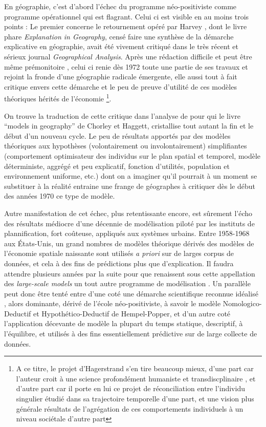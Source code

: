 {En géographie, c'est d'abord l'échec du programme néo-positiviste comme programme opérationnel qui est flagrant. Celui ci est visible en au moins trois points : Le premier concerne le retournement opéré par Harvey \autocite{Harvey1969}, dont le livre phare \textit{Explanation in Geography}, censé faire une synthèse de la démarche explicative en géographie, avait été vivement critiqué \autocite{Gale1972} dans le très récent et sérieux journal \textit{Geographical Analysis}. Après une rédaction difficile et peut être même prémonitoire \autocite[47]{Barnes2006}, celui ci renie dès 1972 \autocite{Harvey1972} toute une partie de ses travaux et rejoint la fronde d'une géographie radicale émergente, elle aussi tout à fait critique envers cette démarche et le peu de preuve d'utilité de ces modèles théoriques hérités de l'économie \footnote{A ce titre, le projet d'Hagerstrand s'en tire beaucoup mieux, d'une part car l'auteur croit à une science profondément humaniste et transdiscplinaire \autocite{Bailly2000}, et d'autre part car il porte en lui ce projet de réconciliation entre l'individu singulier étudié dans sa trajectoire temporelle d'une part, et une vision plus générale résultats de l’agrégation de ces comportements individuels à un niveau sociétale d'autre part}.

On trouve la traduction de cette critique dans l'analyse de \textcite{Golledge2006} pour qui le livre \foreignquote{english}{models in geography} de Chorley et Haggett,  cristallise tout autant la fin et le début d'un nouveau cycle. Le peu de résultats apportés par des modèles théoriques aux hypothèses (volontairement ou involontairement) simplifiantes (comportement optimisateur des individus sur le plan spatial et temporel, modèle déterministe, aggrégé et peu explicatif, fonction d'utilités, population et environnement uniforme, etc.) dont on a imaginer qu'il pourrait à un moment se substituer à la réalité entraine une frange de géographes à critiquer dès le début des années 1970 ce type de modèle. 

Autre manifestation de cet échec, plus retentissante encore, est sûrement l'écho \autocite{Lee1973} des résultats médiocre d'une décennie de modélisation piloté par les instituts de plannification, fort coûteuse, appliqués aux systèmes urbains. Entre 1958-1968 aux États-Unis, un grand nombres de modèles théorique \autocite[7-9]{Batty1979} dérivés des modèles de l'économie spatiale naissante sont utilisés \textit{a priori} sur de larges corpus de données, et cela à des fins de prédictions plus que d'explication. Il faudra attendre plusieurs années par la suite pour que renaissent sous cette appellation des \textit{large-scale models} un tout autre programme de modélisation \autocite{Boyce1988}. Un parallèle peut donc être tenté entre d'une coté une démarche scientifique reconnue idéalisé \autocite{Besse2000}, alors dominante, dérivé de l'école néo-positiviste, à savoir le modèle Nomologico-Deductif et Hypothético-Deductif de Hempel-Popper, et d'un autre coté l'application décevante de modèle la plupart du temps statique, descriptif, à l'équilibre, et utilisés à des fins essentiellement prédictive sur de large collecte de données. 

}
